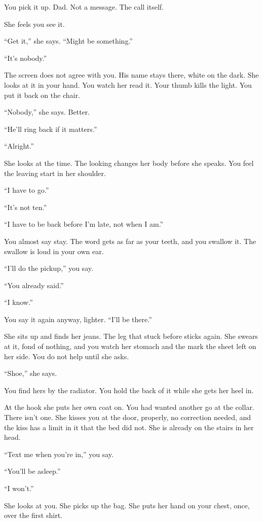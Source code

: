 \documentclass[11pt,oneside]{book}
\begin{document}
You pick it up. Dad. Not a message. The call itself.

She feels you see it.

``Get it,'' she says. ``Might be something.''

``It's nobody.''

The screen does not agree with you. His name stays there, white on the dark. She looks at it in your hand. You watch her read it. Your thumb kills the light. You put it back on the chair.

``Nobody,'' she says. Better.

``He'll ring back if it matters.''

``Alright.''

She looks at the time. The looking changes her body before she speaks. You feel the leaving start in her shoulder.

``I have to go.''

``It's not ten.''

``I have to be back before I'm late, not when I am.''

You almost say stay. The word gets as far as your teeth, and you swallow it. The swallow is loud in your own ear.

``I'll do the pickup,'' you say.

``You already said.''

``I know.''

You say it again anyway, lighter. ``I'll be there.''

She sits up and finds her jeans. The leg that stuck before sticks again. She swears at it, fond of nothing, and you watch her stomach and the mark the sheet left on her side. You do not help until she asks.

``Shoe,'' she says.

You find hers by the radiator. You hold the back of it while she gets her heel in.

At the hook she puts her own coat on. You had wanted another go at the collar. There isn't one. She kisses you at the door, properly, no correction needed, and the kiss has a limit in it that the bed did not. She is already on the stairs in her head.

``Text me when you're in,'' you say.

``You'll be asleep.''

``I won't.''

She looks at you. She picks up the bag. She puts her hand on your chest, once, over the first shirt.
\end{document}
